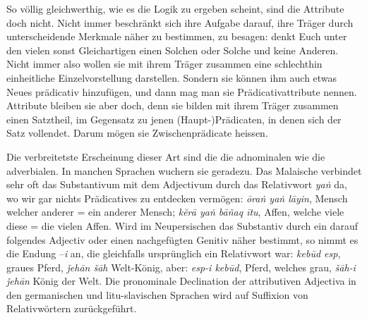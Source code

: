 So völlig gleichwerthig, wie es die Logik zu ergeben scheint, sind die Attribute doch nicht. Nicht immer beschränkt sich ihre Aufgabe darauf, ihre Träger durch unterscheidende Merkmale näher zu bestimmen, zu besagen: denkt Euch unter den vielen sonst Gleichartigen einen Solchen oder Solche und keine Anderen. Nicht immer also wollen sie mit ihrem Träger zusammen eine schlechthin einheitliche Einzelvorstellung darstellen. Sondern sie können ihm auch etwas Neues prädicativ hinzufügen, und dann mag man sie Prädicativattribute nennen. Attribute bleiben sie aber doch, denn sie bilden mit ihrem Träger zu\label{sp.457}sammen einen Satztheil, im Gegensatz zu jenen (Haupt-)Prädicaten, in denen sich der Satz vollendet. Darum mögen sie Zwischenprädicate heissen.

Die verbreitetste Erscheinung dieser Art sind die  die \label{fp.437} adnominalen wie die adverbialen. In manchen Sprachen wuchern sie geradezu. Das Malaische verbindet sehr oft das Substantivum mit dem Adjectivum durch das Relativwort \textit{yaṅ} da, wo wir gar nichts Prädicatives zu entdecken vermögen: \textit{ōraṅ yaṅ lāyin}, Mensch welcher anderer = ein anderer Mensch; \textit{kĕrā yaṅ bāñaq ītu}, Affen, welche viele diese = die vielen Affen.  Wird im Neupersischen das Substantiv durch ein darauf folgendes Adjectiv oder einen nachgefügten Genitiv näher bestimmt, so nimmt es die Endung –\textit{i} an, die gleichfalls ursprünglich ein Relativwort war: \textit{kebūd esp}, graues Pferd, \textit{ǰehān šāh} Welt-König, aber: \textit{esp-i kebūd}, Pferd, welches grau, \textit{šāh-i ǰehān} König der Welt. Die pronominale Declination der attributiven Adjectiva in den germanischen und litu-slavischen Sprachen wird auf Suffixion von Relativwörtern zurückgeführt.

